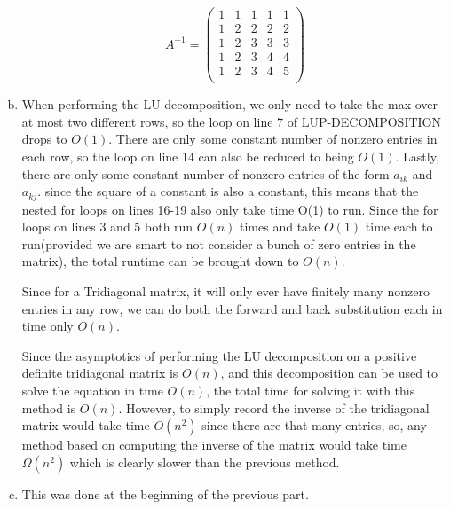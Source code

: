 \documentclass{article}
\begin{document}
\begin{enumerate}[a.]
\[
A^{-1} = \left(\begin{array}{ccccc}
1&1&1&1&1\\
1&2&2&2&2\\
1&2&3&3&3\\
1&2&3&4&4\\
1&2&3&4&5\\
\end{array}\right)
\]
\item
When performing the LU decomposition, we only need to take the max over at most two different rows, so the loop on line 7 of LUP-DECOMPOSITION drops to $O(1)$. There are only some constant number of nonzero entries in each row, so the loop on line 14 can also be reduced to being $O(1)$. Lastly, there are only some constant number of nonzero entries of the form $a_{ik}$ and $a_{kj}$. since the square of a constant is also a constant, this means that the nested for loops on lines 16-19 also only take time O(1) to run. Since the for loops on lines 3 and 5 both run $O(n)$ times and take $O(1)$ time each to run(provided we are smart to not consider a bunch of zero entries in the matrix), the total runtime can be brought down to $O(n)$.

Since for a Tridiagonal matrix, it will only ever have finitely many nonzero entries in any row, we can do both the forward and back substitution each in time only $O(n)$.

Since the asymptotics of performing the LU decomposition on a positive definite tridiagonal matrix is $O(n)$, and this decomposition can be used to solve the equation in time $O(n)$, the total time for solving it with this method is $O(n)$. However, to simply record the inverse of the tridiagonal matrix would take time $O(n^2)$ since there are that many entries, so, any method based on computing the inverse of the matrix would take time $\Omega(n^2)$ which is clearly slower than the previous method.

\item
This was done at the beginning of the previous part.

\end{enumerate}
\end{document}
